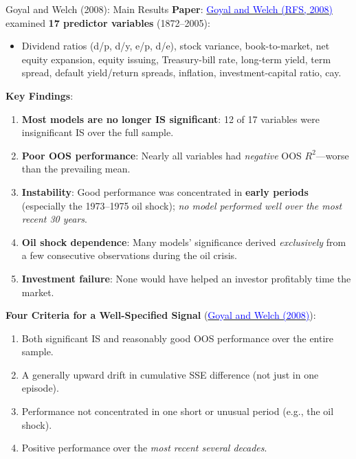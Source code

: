 \documentclass{beamer}
\begin{document}
\begin{frame}[allowframebreaks]{Goyal and Welch (2008): Main Results}
    \textbf{Paper}: \href{https://doi.org/10.1093/rfs/hhm014}{\textcolor{blue}{Goyal and Welch (RFS, 2008)}} examined \textbf{17 predictor variables} (1872--2005):
    \begin{itemize}
        \item Dividend ratios (d/p, d/y, e/p, d/e), stock variance, book-to-market, net equity expansion, equity issuing, Treasury-bill rate, long-term yield, term spread, default yield/return spreads, inflation, investment-capital ratio, cay.
    \end{itemize}

    \vspace{0.3cm}
    \textbf{Key Findings}:
    \begin{enumerate}
        \item \textbf{Most models are no longer IS significant}: 12 of 17 variables were insignificant IS over the full sample.
        \item \textbf{Poor OOS performance}: Nearly all variables had \textit{negative} OOS $R^2$---worse than the prevailing mean.
        \item \textbf{Instability}: Good performance was concentrated in \textbf{early periods} (especially the 1973--1975 oil shock); \textit{no model performed well over the most recent 30 years}.
        \item \textbf{Oil shock dependence}: Many models' significance derived \textit{exclusively} from a few consecutive observations during the oil crisis.
        \item \textbf{Investment failure}: None would have helped an investor profitably time the market.
    \end{enumerate}

    \framebreak

    \textbf{Four Criteria for a Well-Specified Signal} (\href{https://doi.org/10.1093/rfs/hhm014}{\textcolor{blue}{Goyal and Welch (2008)}}):
    \begin{enumerate}
        \item Both significant IS and reasonably good OOS performance over the entire sample.
        \item A generally upward drift in cumulative SSE difference (not just in one episode).
        \item Performance not concentrated in one short or unusual period (e.g., the oil shock).
        \item Positive performance over the \textit{most recent several decades}.
    \end{enumerate}


\end{frame}
\end{document}
